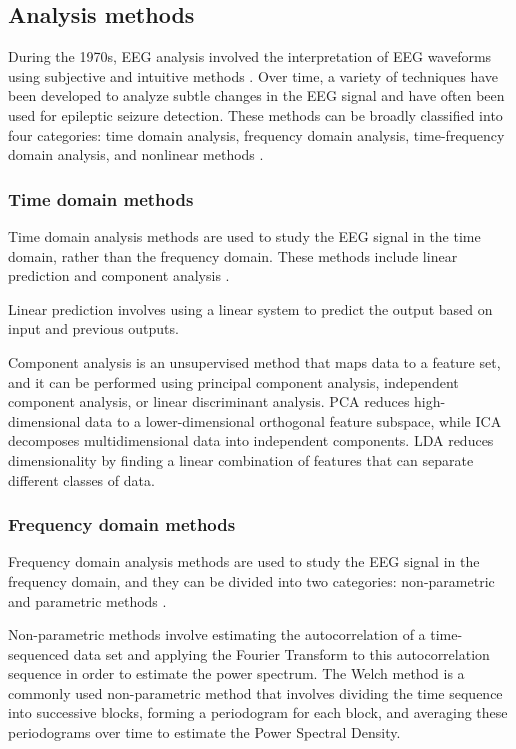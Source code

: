 \subsection{ Analysis methods}
During the 1970s, EEG analysis involved the interpretation of \gls{EEG} waveforms using subjective and intuitive methods \cite{callaway_coupling_1974}. Over time, a variety of techniques have been developed to analyze subtle changes in the \gls{EEG} signal and have often been used for epileptic seizure detection. These methods can be broadly classified into four categories: time domain analysis, frequency domain analysis, time-frequency domain analysis, and nonlinear methods \cite{acharya_automated_2013}.

\subsubsection{Time domain methods}
Time domain analysis methods are used to study the \gls{EEG} signal in the time domain, rather than the frequency domain. These methods include linear prediction and component analysis \cite{acharya_automated_2013}. 

Linear prediction involves using a linear system to predict the output based on input and previous outputs.

Component analysis is an unsupervised method that maps data to a feature set, and it can be performed using principal component analysis, independent component analysis, or linear discriminant analysis. 
\gls{PCA} reduces high-dimensional data to a lower-dimensional orthogonal feature subspace, while \gls{ICA} decomposes multidimensional data into independent components. 
\gls{LDA} reduces dimensionality by finding a linear combination of features that can separate different classes of data. 

\subsubsection{Frequency domain methods}
Frequency domain analysis methods are used to study the \gls{EEG} signal in the frequency domain, and they can be divided into two categories: non-parametric and parametric methods \cite{acharya_automated_2013}.

Non-parametric methods involve estimating the autocorrelation of a time-sequenced data set and applying the Fourier Transform to this autocorrelation sequence in order to estimate the power spectrum. 
The Welch method is a commonly used non-parametric method that involves dividing the time sequence into successive blocks, forming a periodogram for each block, and averaging these periodograms over time to estimate the Power Spectral Density. 

